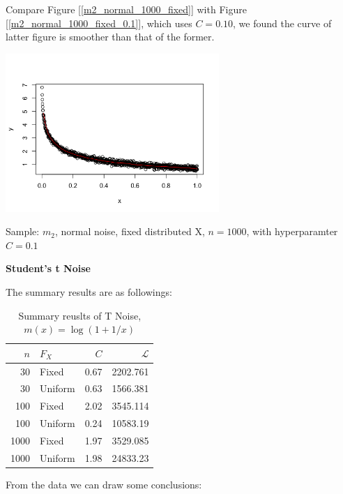 \documentclass[twoside]{article}
\begin{document}
Compare Figure [\ref{m2_normal_1000_fixed}] with Figure [\ref{m2_normal_1000_fixed_0.1}], which uses $C=0.10$, we found the curve of latter figure is  smoother than that of the former.

\begin{center}
\makeatletter
\def\@captype{figure}
\makeatother
\includegraphics [height=6cm]{code/m2_normal_1000_fixed_0.1.png}
\caption{Sample: $m_2$, normal noise, fixed distributed X, $n=1000$, with hyperparamter $C=0.1$}
\label{m2_normal_1000_fixed_0.1}
\end{center}

\noindent \textbf{Student's t Noise}

The summary results are as followings:

\begin{table}[ht]
\centering
\caption{Summary reuslts of T Noise, $m(x)=\log(1+1/x)$}
\begin{tabular}{rlrr}
  \hline
  $n$ & $F_X$ & $C$ & $\mathcal{L}$ \\ 
  \hline
  30 & Fixed & 0.67 & 2202.761 \\ 
  30 & Uniform & 0.63 & 1566.381\\ 
  \hline
  100 & Fixed & 2.02 & 3545.114\\
  100 & Uniform & 0.24 & 10583.19\\
  \hline
  1000 & Fixed & 1.97 & 3529.085\\
  1000 & Uniform & 1.98 & 24833.23\\
  \hline
\end{tabular}
\label{cu}
\end{table}

From the data we can draw some conclusions:
\end{document}
